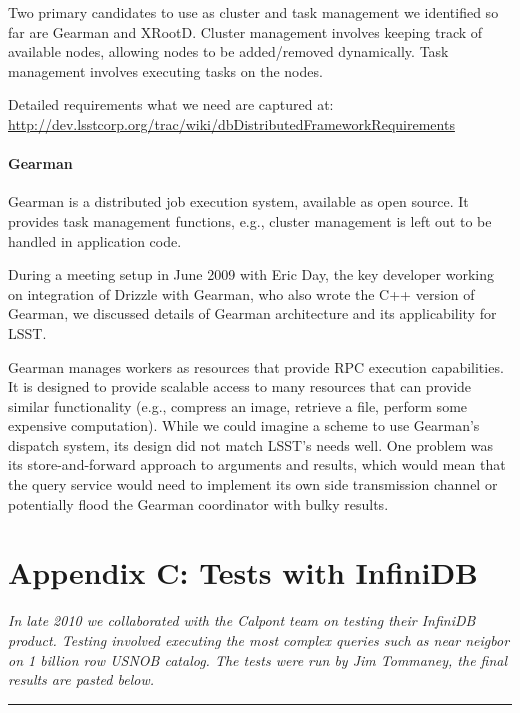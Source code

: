 \documentclass[DM,lsstdraft,toc]{lsstdoc}
\begin{document}
Two primary candidates to use as cluster and task management we
identified so far are Gearman and XRootD.
Cluster management involves keeping track of available nodes, allowing
nodes to be added/removed dynamically. Task management involves
executing tasks on the nodes.

Detailed requirements what we need are captured at:
\url{http://dev.lsstcorp.org/trac/wiki/dbDistributedFrameworkRequirements}

\paragraph{Gearman}\label{gearman}

Gearman \citep{Gearman} is a distributed job execution
system, available as open source. It provides task management functions,
e.g., cluster management is left out to be handled in application code.

During a meeting setup in June 2009 with Eric Day, the key developer
working on integration of Drizzle with
Gearman, who also wrote the C++ version of
Gearman, we discussed details of
Gearman architecture and its applicability
for LSST.

Gearman manages workers as resources that
provide RPC execution capabilities. It is designed to provide scalable
access to many resources that can provide similar functionality (e.g.,
compress an image, retrieve a file, perform some expensive computation).
While we could imagine a scheme to use
Gearman's dispatch system, its design did
not match LSST's needs well. One problem was its store-and-forward
approach to arguments and results, which would mean that the query
service would need to implement its own side transmission channel or
potentially flood the Gearman coordinator
with bulky results.

\section{Appendix C: Tests with
InfiniDB}\label{appendix-c-tests-with-infinidb}

\emph{In late 2010 we collaborated with the Calpont team on testing
their InfiniDB product. Testing involved executing the most complex
queries such as near neigbor on 1 billion row USNOB catalog. The tests
were run by Jim Tommaney, the final results are pasted below.}

\begin{center}\rule{0.5\linewidth}{\linethickness}\end{center}
\end{document}
